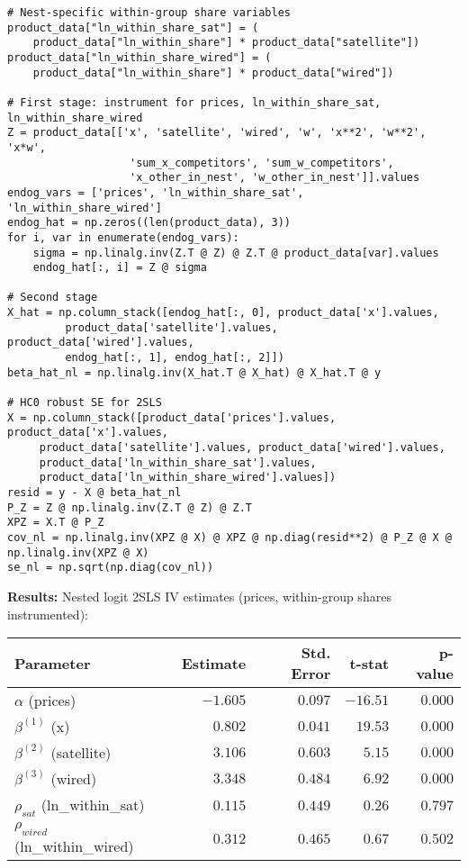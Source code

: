 \documentclass[english,11pt]{article}
\begin{document}
\begin{enumerate}
\begin{enumerate}
\begin{verbatim}
# Nest-specific within-group share variables
product_data["ln_within_share_sat"] = (
    product_data["ln_within_share"] * product_data["satellite"])
product_data["ln_within_share_wired"] = (
    product_data["ln_within_share"] * product_data["wired"])

# First stage: instrument for prices, ln_within_share_sat, ln_within_share_wired
Z = product_data[['x', 'satellite', 'wired', 'w', 'x**2', 'w**2', 'x*w',
                   'sum_x_competitors', 'sum_w_competitors', 
                   'x_other_in_nest', 'w_other_in_nest']].values
endog_vars = ['prices', 'ln_within_share_sat', 'ln_within_share_wired']
endog_hat = np.zeros((len(product_data), 3))
for i, var in enumerate(endog_vars):
    sigma = np.linalg.inv(Z.T @ Z) @ Z.T @ product_data[var].values
    endog_hat[:, i] = Z @ sigma

# Second stage
X_hat = np.column_stack([endog_hat[:, 0], product_data['x'].values,
         product_data['satellite'].values, product_data['wired'].values,
         endog_hat[:, 1], endog_hat[:, 2]])
beta_hat_nl = np.linalg.inv(X_hat.T @ X_hat) @ X_hat.T @ y

# HC0 robust SE for 2SLS
X = np.column_stack([product_data['prices'].values, product_data['x'].values,
     product_data['satellite'].values, product_data['wired'].values,
     product_data['ln_within_share_sat'].values, 
     product_data['ln_within_share_wired'].values])
resid = y - X @ beta_hat_nl
P_Z = Z @ np.linalg.inv(Z.T @ Z) @ Z.T
XPZ = X.T @ P_Z
cov_nl = np.linalg.inv(XPZ @ X) @ XPZ @ np.diag(resid**2) @ P_Z @ X @ np.linalg.inv(XPZ @ X)
se_nl = np.sqrt(np.diag(cov_nl))
\end{verbatim}

\textbf{Results:} Nested logit 2SLS IV estimates (prices, within-group shares instrumented):

\begin{center}
\begin{tabular}{lrrrr}
\hline
Parameter & Estimate & Std. Error & t-stat & p-value \\
\hline
$\alpha$ (prices) & $-1.605$ & $0.097$ & $-16.51$ & $0.000$ \\
$\beta^{(1)}$ (x) & $0.802$ & $0.041$ & $19.53$ & $0.000$ \\
$\beta^{(2)}$ (satellite) & $3.106$ & $0.603$ & $5.15$ & $0.000$ \\
$\beta^{(3)}$ (wired) & $3.348$ & $0.484$ & $6.92$ & $0.000$ \\
$\rho_{sat}$ (ln\_within\_sat) & $0.115$ & $0.449$ & $0.26$ & $0.797$ \\
$\rho_{wired}$ (ln\_within\_wired) & $0.312$ & $0.465$ & $0.67$ & $0.502$ \\
\hline
\end{tabular}
\end{center}


\end{enumerate}
\end{enumerate}
\end{document}
